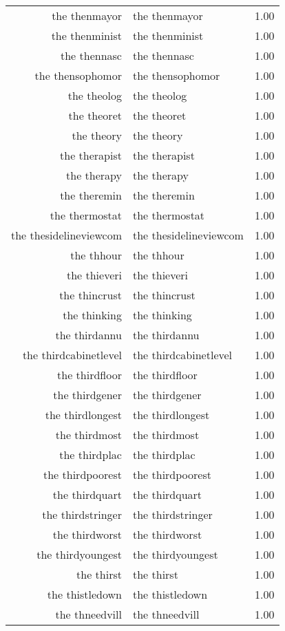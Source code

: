 \begin{table}[ht]
\begin{tabular}{rlr}
  the thenmayor & the thenmayor & 1.00 \\ 
  the thenminist & the thenminist & 1.00 \\ 
  the thennasc & the thennasc & 1.00 \\ 
  the thensophomor & the thensophomor & 1.00 \\ 
  the theolog & the theolog & 1.00 \\ 
  the theoret & the theoret & 1.00 \\ 
  the theory & the theory & 1.00 \\ 
  the therapist & the therapist & 1.00 \\ 
  the therapy & the therapy & 1.00 \\ 
  the theremin & the theremin & 1.00 \\ 
  the thermostat & the thermostat & 1.00 \\ 
  the thesidelineviewcom & the thesidelineviewcom & 1.00 \\ 
  the thhour & the thhour & 1.00 \\ 
  the thieveri & the thieveri & 1.00 \\ 
  the thincrust & the thincrust & 1.00 \\ 
  the thinking & the thinking & 1.00 \\ 
  the thirdannu & the thirdannu & 1.00 \\ 
  the thirdcabinetlevel & the thirdcabinetlevel & 1.00 \\ 
  the thirdfloor & the thirdfloor & 1.00 \\ 
  the thirdgener & the thirdgener & 1.00 \\ 
  the thirdlongest & the thirdlongest & 1.00 \\ 
  the thirdmost & the thirdmost & 1.00 \\ 
  the thirdplac & the thirdplac & 1.00 \\ 
  the thirdpoorest & the thirdpoorest & 1.00 \\ 
  the thirdquart & the thirdquart & 1.00 \\ 
  the thirdstringer & the thirdstringer & 1.00 \\ 
  the thirdworst & the thirdworst & 1.00 \\ 
  the thirdyoungest & the thirdyoungest & 1.00 \\ 
  the thirst & the thirst & 1.00 \\ 
  the thistledown & the thistledown & 1.00 \\ 
  the thneedvill & the thneedvill & 1.00 \\ 

\end{tabular}
\end{table}
